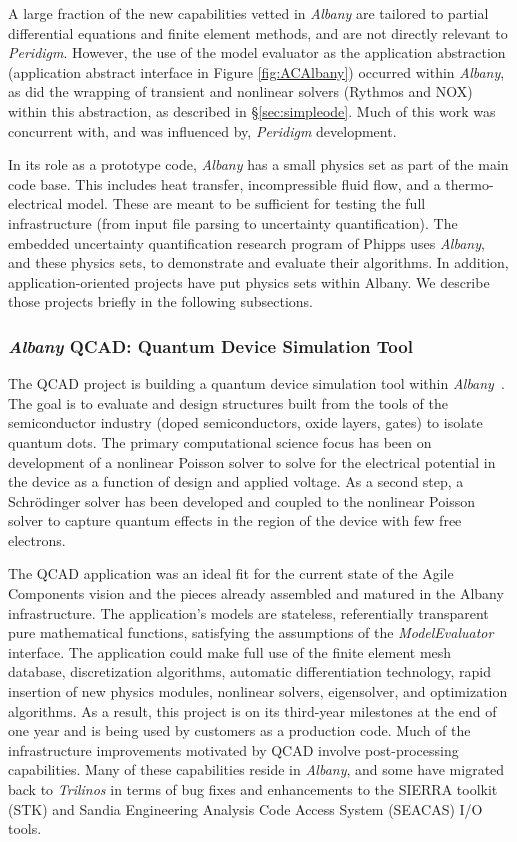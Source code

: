 \documentclass[pdf,ps2pdf,12pt,report]{SANDreport}
\theoremstyle{plain}
\theoremstyle{definition}
\theoremstyle{remark}
\numberwithin{equation}{section}
\begin{document}
A large fraction of the new capabilities vetted in \emph{Albany} are tailored to partial differential equations and finite element methods, and are not directly relevant to \emph{Peridigm}. However, the use of the model evaluator as the application abstraction (application abstract interface in Figure \ref{fig:ACAlbany}) occurred within \emph{Albany}, as did the wrapping of transient and nonlinear solvers (Rythmos and NOX) within this abstraction, as described in \S\ref{sec:simpleode}. Much of this work was concurrent with, and was influenced by, \emph{Peridigm} development.

In its role as a prototype code, \emph{Albany} has a small physics set as part of the main code base. This includes heat transfer, incompressible fluid flow, and a thermo-electrical model. These are meant to be sufficient for testing the full infrastructure (from input file parsing to uncertainty quantification). The embedded uncertainty quantification research program of Phipps uses \emph{Albany}, and these physics sets, to demonstrate and evaluate their algorithms. In addition, application-oriented projects have put physics sets within Albany. We describe those projects briefly in the following subsections.

\subsubsection{\emph{Albany} QCAD: Quantum Device Simulation Tool} \label{sec:albany:qcad}

The QCAD project is building a quantum device simulation tool within \emph{Albany}~\cite{QCADWebPage:2011}. The goal is to evaluate and design structures built from the tools of the semiconductor industry (doped semiconductors, oxide layers, gates) to isolate quantum dots. The primary computational science focus has been on development of a nonlinear Poisson solver to solve for the electrical potential in the device as a function of design and applied voltage. As a second step, a Schr\"{o}dinger solver has been developed and coupled to the nonlinear Poisson solver to capture quantum effects in the region of the device with few free electrons.

The QCAD application was an ideal fit for the current state of the Agile Components vision and the pieces already assembled and matured in the Albany infrastructure. The application's models are stateless, referentially transparent pure mathematical functions, satisfying the assumptions of the \emph{ModelEvaluator} interface. The application could make full use of the finite element mesh database, discretization algorithms, automatic differentiation technology, rapid insertion of new physics modules, nonlinear solvers, eigensolver, and optimization algorithms. As a result, this project is on its third-year milestones at the end of one year and is being used by customers as a production code. Much of the infrastructure improvements motivated by QCAD involve post-processing capabilities.  Many of these capabilities reside in \emph{Albany}, and some have migrated back to \emph{Trilinos} in terms of bug fixes and enhancements to the SIERRA toolkit (STK) and Sandia Engineering Analysis Code Access System (SEACAS) I/O tools.
\end{document}
